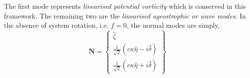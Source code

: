 The first mode represents \emph{linearised potential vorticity} which is
conserved in this framework. The remaining two are the \emph{linearised
    ageostrophic or wave modes}. In the absence of system rotation, i.e. $f=0$,
the normal modes are simply,
\begin{equation}
    \label{nmode}
    \mathbf{N} =
    \begin{Bmatrix}
        \hat \zeta                                              \\
        \frac{1}{\sqrt{2}} (c\kappa \hat{\eta} - i\hat{\delta}) \\
        \frac{1}{\sqrt{2}} (c\kappa \hat{\eta} + i\hat{\delta})
    \end{Bmatrix}
\end{equation}

